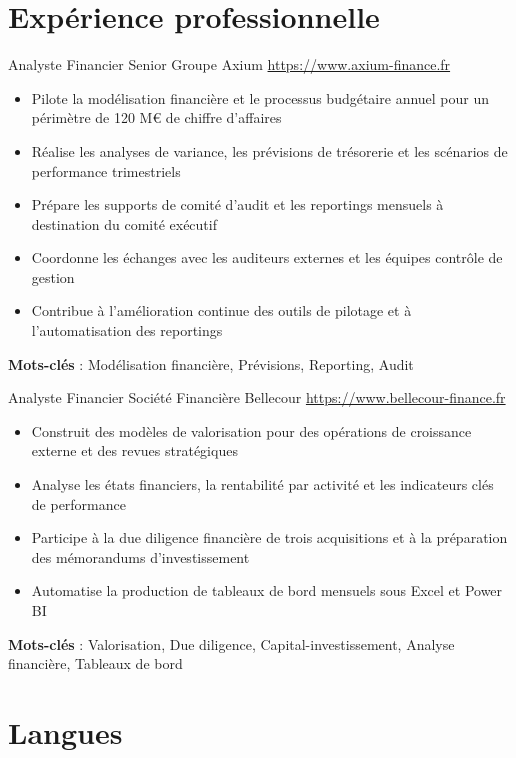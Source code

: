 \documentclass[a4paper, serif, 10pt]{moderncv}
\begin{document}
\section{Expérience professionnelle}

        {Analyste Financier Senior}
        {Groupe Axium}
        {\url{https://www.axium-finance.fr}}
        {}
        {\begin{itemize}
\item Pilote la modélisation financière et le processus budgétaire annuel pour un périmètre de 120 M€ de chiffre d'affaires
\item Réalise les analyses de variance, les prévisions de trésorerie et les scénarios de performance trimestriels
\item Prépare les supports de comité d'audit et les reportings mensuels à destination du comité exécutif
\item Coordonne les échanges avec les auditeurs externes et les équipes contrôle de gestion
\item Contribue à l'amélioration continue des outils de pilotage et à l'automatisation des reportings
\end{itemize}
\textbf{Mots-clés} : Modélisation financière, Prévisions, Reporting, Audit}

        {Analyste Financier}
        {Société Financière Bellecour}
        {\url{https://www.bellecour-finance.fr}}
        {}
        {\begin{itemize}
\item Construit des modèles de valorisation pour des opérations de croissance externe et des revues stratégiques
\item Analyse les états financiers, la rentabilité par activité et les indicateurs clés de performance
\item Participe à la due diligence financière de trois acquisitions et à la préparation des mémorandums d'investissement
\item Automatise la production de tableaux de bord mensuels sous Excel et Power BI
\end{itemize}
\textbf{Mots-clés} : Valorisation, Due diligence, Capital-investissement, Analyse financière, Tableaux de bord}
\section{Langues}

\end{document}
